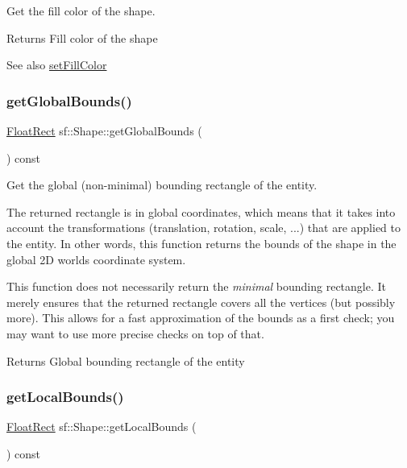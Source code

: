 Get the fill color of the shape. 

\begin{DoxyReturn}{Returns}
Fill color of the shape
\end{DoxyReturn}
\begin{DoxySeeAlso}{See also}
\hyperlink{classsf_1_1_shape_a3506f9b5d916fec14d583d16f23c2485}{set\+Fill\+Color} 
\end{DoxySeeAlso}
\mbox{\label{classsf_1_1_shape_ac0e29425d908d5442060cc44790fe4da}} 
\subsubsection{\texorpdfstring{get\+Global\+Bounds()}{getGlobalBounds()}}
{\footnotesize\ttfamily \hyperlink{classsf_1_1_rect}{Float\+Rect} sf\+::\+Shape\+::get\+Global\+Bounds (\begin{DoxyParamCaption}{ }\end{DoxyParamCaption}) const}



Get the global (non-\/minimal) bounding rectangle of the entity. 

The returned rectangle is in global coordinates, which means that it takes into account the transformations (translation, rotation, scale, ...) that are applied to the entity. In other words, this function returns the bounds of the shape in the global 2D world\textquotesingle{}s coordinate system.

This function does not necessarily return the {\itshape minimal} bounding rectangle. It merely ensures that the returned rectangle covers all the vertices (but possibly more). This allows for a fast approximation of the bounds as a first check; you may want to use more precise checks on top of that.

\begin{DoxyReturn}{Returns}
Global bounding rectangle of the entity 
\end{DoxyReturn}
\mbox{\label{classsf_1_1_shape_ae3294bcdf8713d33a862242ecf706443}} 
\subsubsection{\texorpdfstring{get\+Local\+Bounds()}{getLocalBounds()}}
{\footnotesize\ttfamily \hyperlink{classsf_1_1_rect}{Float\+Rect} sf\+::\+Shape\+::get\+Local\+Bounds (\begin{DoxyParamCaption}{ }\end{DoxyParamCaption}) const}



